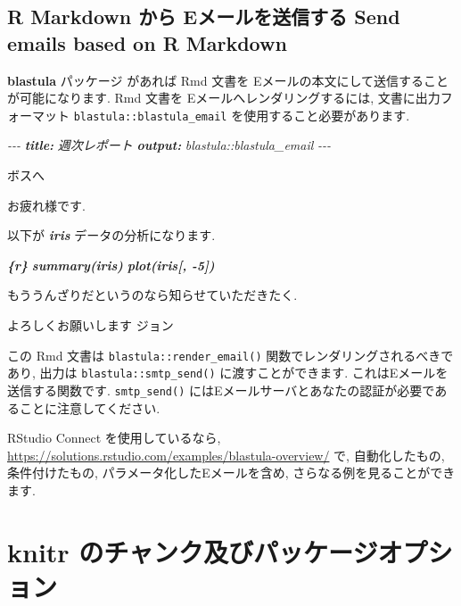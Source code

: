 \documentclass[
  11pt,
]{bxjsreport}
\newenvironment{Shaded}{\begin{snugshade}}{\end{snugshade}}
\newcommand{\AnnotationTok}[1]{\textcolor[rgb]{0.56,0.35,0.01}{\textbf{\textit{#1}}}}
\newcommand{\CommentTok}[1]{\textcolor[rgb]{0.56,0.35,0.01}{\textit{#1}}}
\newcommand{\InformationTok}[1]{\textcolor[rgb]{0.56,0.35,0.01}{\textbf{\textit{#1}}}}
\newcommand{\NormalTok}[1]{#1}
\begin{document}
\hypertarget{blastula-email}{%
\section{R Markdown から Eメールを送信する Send emails based on R Markdown}\label{blastula-email}}

\textbf{blastula} パッケージ \autocite{R-blastula}があれば Rmd 文書を Eメールの本文にして送信することが可能になります. Rmd 文書を Eメールへレンダリングするには, 文書に出力フォーマット \texttt{blastula::blastula\_email} を使用すること必要があります.

\begin{Shaded}
\begin{Highlighting}[]
\CommentTok{{-}{-}{-}}
\AnnotationTok{title:}\CommentTok{ 週次レポート}
\AnnotationTok{output:}\CommentTok{ blastula::blastula\_email}
\CommentTok{{-}{-}{-}} 

\NormalTok{ボスへ}

\NormalTok{お疲れ様です.}

\NormalTok{以下が }\InformationTok{\textasciigrave{}iris\textasciigrave{}}\NormalTok{ データの分析になります.}

\InformationTok{\textasciigrave{}\textasciigrave{}\textasciigrave{}\{r\}}
\InformationTok{summary(iris)}
\InformationTok{plot(iris[, {-}5])}
\InformationTok{\textasciigrave{}\textasciigrave{}\textasciigrave{}}

\NormalTok{もううんざりだというのなら知らせていただきたく.}

\NormalTok{よろしくお願いします}
\NormalTok{ジョン}
\end{Highlighting}
\end{Shaded}

この Rmd 文書は \texttt{blastula::render\_email()} 関数でレンダリングされるべきであり, 出力は \texttt{blastula::smtp\_send()} に渡すことができます. これはEメールを送信する関数です. \texttt{smtp\_send()} にはEメールサーバとあなたの認証が必要であることに注意してください.

RStudio Connect を使用しているなら, \url{https://solutions.rstudio.com/examples/blastula-overview/} で, 自動化したもの, 条件付けたもの, パラメータ化したEメールを含め, さらなる例を見ることができます.

\hypertarget{appendix-ux88dcux907a}{%
\appendix}


\hypertarget{full-options}{%
\chapter{\texorpdfstring{\textbf{knitr} のチャンク及びパッケージオプション}{knitr のチャンク及びパッケージオプション}}\label{full-options}}
\end{document}
